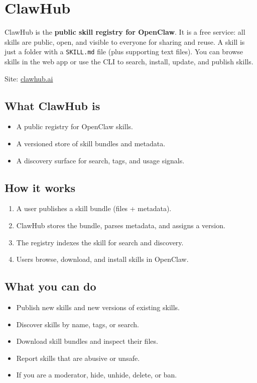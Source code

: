 \clearpage

\section{ClawHub}


ClawHub is the \textbf{public skill registry for OpenClaw}. It is a free service: all skills are public, open, and visible to everyone for sharing and reuse. A skill is just a folder with a \texttt{SKILL.md} file (plus supporting text files). You can browse skills in the web app or use the CLI to search, install, update, and publish skills.

Site: \href{https://clawhub.ai}{clawhub.ai}

\subsection{What ClawHub is}


\begin{itemize}
  \item A public registry for OpenClaw skills.
  \item A versioned store of skill bundles and metadata.
  \item A discovery surface for search, tags, and usage signals.
\end{itemize}


\subsection{How it works}


\begin{enumerate}
  \item A user publishes a skill bundle (files + metadata).
  \item ClawHub stores the bundle, parses metadata, and assigns a version.
  \item The registry indexes the skill for search and discovery.
  \item Users browse, download, and install skills in OpenClaw.
\end{enumerate}


\subsection{What you can do}


\begin{itemize}
  \item Publish new skills and new versions of existing skills.
  \item Discover skills by name, tags, or search.
  \item Download skill bundles and inspect their files.
  \item Report skills that are abusive or unsafe.
  \item If you are a moderator, hide, unhide, delete, or ban.
\end{itemize}


